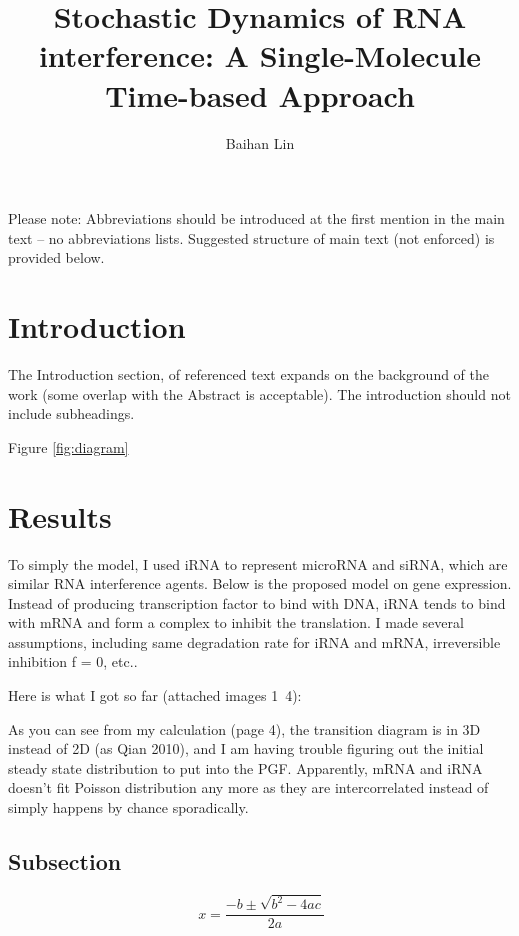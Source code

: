 \documentclass[fleqn,10pt]{wlscirep}
\title{Stochastic Dynamics of RNA interference: A Single-Molecule Time-based Approach}
\author[1*]{Baihan Lin}
\affil[1]{Department of Applied Mathematics, University of Washington, Seattle, WA 98195, USA}
\affil[*]{doerlbh@gmail.com}
\begin{document}
\flushbottom
\maketitle
\thispagestyle{empty}

\noindent Please note: Abbreviations should be introduced at the first mention in the main text – no abbreviations lists. Suggested structure of main text (not enforced) is provided below.

\section*{Introduction}

The Introduction section, of referenced text\cite{Figueredo:2009dg} expands on the background of the work (some overlap with the Abstract is acceptable). The introduction should not include subheadings.

Figure \ref{fig:diagram}

\section*{Results}

To simply the model, I used iRNA to represent microRNA and siRNA, which are similar RNA interference agents. Below is the proposed model on gene expression. Instead of producing transcription factor to bind with DNA, iRNA tends to bind with mRNA and form a complex to inhibit the translation. I made several assumptions, including same degradation rate for iRNA and mRNA, irreversible inhibition f = 0, etc..
 
Here is what I got so far (attached images 1~4):
 
As you can see from my calculation (page 4), the transition diagram is in 3D instead of 2D (as Qian 2010), and I am having trouble figuring out the initial steady state distribution to put into the PGF. Apparently, mRNA and iRNA doesn’t fit Poisson distribution any more as they are intercorrelated instead of simply happens by chance sporadically.




\subsection*{Subsection}

\begin{equation}
\ x=\frac{-b\pm\sqrt{b^2-4ac}}{2a}
\end{equation}
\end{document}
